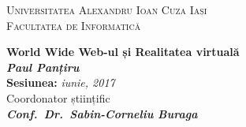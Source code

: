 \begin{titlepage}

\begin{center}

\textsc{\Large Universitatea Alexandru Ioan Cuza Iași}\\
\textsc{\Large Facultatea de Informatică}
\vfill



{ \huge \bfseries World Wide Web-ul și Realitatea virtuală}\\[1.5cm]
\textit{\textbf{\Large Paul Panțiru}}\\[1cm]
\Large \textbf{Sesiunea:} \textit{iunie, 2017}\\[2cm]


{\large
Coordonator științific \\
\emph{\textbf{Conf.\ Dr.\ Sabin-Corneliu Buraga}}
}


\vfill


\end{center}

\newpage
\thispagestyle{empty}
\mbox{}

\end{titlepage}
